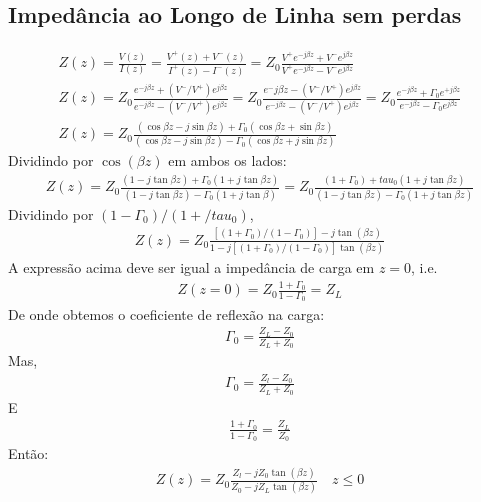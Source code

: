 \documentclass[11pt,a4paper]{article}
\begin{document}
\subsection{Impedância ao Longo de Linha sem perdas}
\begin{align*}
  Z(z)= \frac{V(z)}{I(z)}= \frac{V^+ (z) + V^- (z)}{I^+ (z) - I^- (z)}= Z_0 \frac{V^+ e^{-j\beta z} + V^- e^{j \beta z}}{V^+ e^{-j \beta z} - V^- e^{j \beta z}}\\
  Z(z)=Z_0 \frac{e^{-j \beta z} + (V^- / V^+) e^{j \beta z}}{e^{-j \beta z} - (V^- / V^+) e^{j \beta z}}= Z_0 \frac{e^-{j \beta z} - (V^-/ V^+) e^{j \beta z}}{e^{-j \beta z} - (V^-/ V^+)e^{j\beta z}}= Z_0 \frac{e^{-j \beta z} + \Gamma_0 e^{+ j \beta z} }{e^{- j \beta z} - \Gamma_0 e^{j\beta z}}\\
  Z(z)= Z_0 \frac{(\cos \beta z - j \sin \beta z)+ \Gamma_0(\cos \beta z + \sin \beta z)}{(\cos \beta z - j\sin \beta z)- \Gamma_0 (\cos \beta z + j \sin \beta z)}
\end{align*}
Dividindo por $\cos (\beta z)$ em ambos os lados:
\begin{align*}
  Z(z)= Z_0 \frac{( 1-j\tan \beta z )+ \Gamma_0 (1+ j \tan \beta z)}{(1- j \tan \beta z)-\Gamma_0 (1+j \tan \beta)}= Z_0 \frac{( 1+\Gamma_0 )+tau_0(1+j\tan \beta z)}{(1-j\tan \beta z)- \Gamma_0 (1+j\tan \beta z)}
\end{align*}
Dividindo por $(1-\Gamma_0)/(1+/tau_0)$,
\begin{align*}
  Z(z)=Z_0 \frac{ \left[ (1+\Gamma_0)/(1-\Gamma_0) \right]- j \tan (\beta z) }{1-j \left[ (1+\Gamma_0)/(1-\Gamma_0) \right] \tan(\beta z)}
\end{align*}
A expressão acima deve ser igual a impedância de carga em $z=0$, i.e.\,
\begin{align*}
  Z(z=0)= Z_0 \frac{1+\Gamma_0}{1-\Gamma_0}= Z_L
\end{align*}
De onde obtemos o coeficiente de reflexão na carga:
\begin{align*}
  \Gamma_0 = \frac{Z_L- Z_0}{Z_L + Z_0}
\end{align*}
Mas,
\begin{align*}
  \Gamma_0 = \frac{Z_l - Z_0}{Z_L + Z_0}
\end{align*}
E
\begin{align*}
  \frac{1+\Gamma_0}{1-\Gamma_0} = \frac{Z_L}{Z_0}
\end{align*}
Então:
\begin{align*}
  Z(z)= Z_0 \frac{Z_l - j Z_0 \tan (\beta z)}{Z_0 - j Z_L \tan(\beta z)} \quad z \leq 0
\end{align*}
\end{document}
